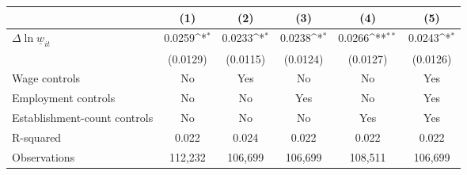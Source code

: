 {
\def\sym#1{\ifmmode^{#1}\else\(^{#1}\)\fi}
\begin{tabular}{l*{5}{c}}
\hline\hline
          &\multicolumn{1}{c}{(1)}         &\multicolumn{1}{c}{(2)}         &\multicolumn{1}{c}{(3)}         &\multicolumn{1}{c}{(4)}         &\multicolumn{1}{c}{(5)}         \\
\hline
$\Delta \ln \underline{w}_{it}$&   0.0259\sym{*}  &   0.0233\sym{*}  &   0.0238\sym{*}  &   0.0266\sym{**} &   0.0243\sym{*}  \\
          & (0.0129)         & (0.0115)         & (0.0124)         & (0.0127)         & (0.0126)         \\
\hline
Wage controls&       No         &      Yes         &       No         &       No         &      Yes         \\
Employment controls&       No         &       No         &      Yes         &       No         &      Yes         \\
Establishment-count controls&       No         &       No         &       No         &      Yes         &      Yes         \\
R-squared &    0.022         &    0.024         &    0.022         &    0.022         &    0.022         \\
Observations&  112,232         &  106,699         &  106,699         &  108,511         &  106,699         \\
\hline\hline
\end{tabular}
}
